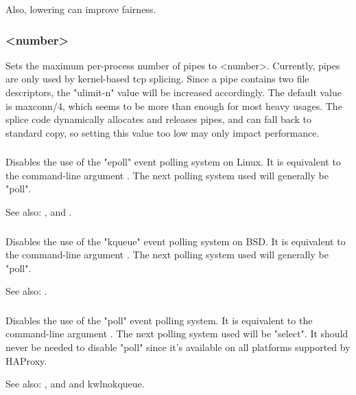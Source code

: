 Also, lowering  can improve fairness.

\subsubsection[maxpipes]{ <number>}
Sets the maximum per-process number of pipes to <number>. Currently, pipes
are only used by kernel-based tcp splicing. Since a pipe contains two file
descriptors, the "ulimit-n" value will be increased accordingly. The default
value is maxconn/4, which seems to be more than enough for most heavy usages.
The splice code dynamically allocates and releases pipes, and can fall back
to standard copy, so setting this value too low may only impact performance.

\subsubsection[noepoll]{}

Disables the use of the "epoll" event polling system on Linux. It is
equivalent to the command-line argument . The next polling system
used will generally be "poll".

See also: , and .

\subsubsection[nokqueue]{}

Disables the use of the "kqueue" event polling system on BSD. It is
equivalent to the command-line argument . The next polling system
used will generally be "poll".

See also: .

\subsubsection[nopoll]{}

Disables the use of the "poll" event polling system. It is equivalent to the
command-line argument . The next polling system used will be "select".
It should never be needed to disable "poll" since it's available on all
platforms supported by HAProxy.

See also: , and  and kwl{nokqueue}.

\subsubsection[nosepoll]{}

